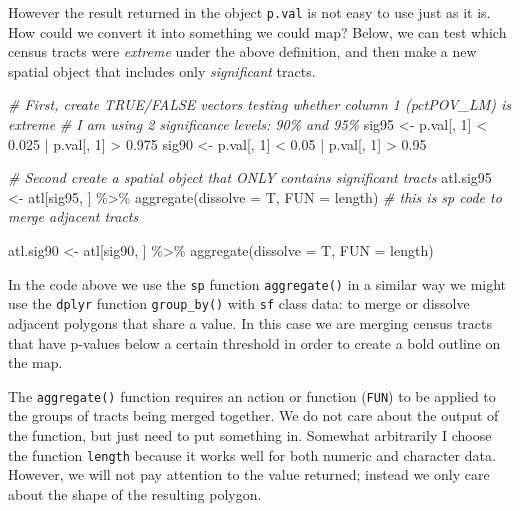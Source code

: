 \documentclass[
]{book}
\newenvironment{Shaded}{\begin{snugshade}}{\end{snugshade}}
\newcommand{\AttributeTok}[1]{\textcolor[rgb]{0.77,0.63,0.00}{#1}}
\newcommand{\CommentTok}[1]{\textcolor[rgb]{0.56,0.35,0.01}{\textit{#1}}}
\newcommand{\DecValTok}[1]{\textcolor[rgb]{0.00,0.00,0.81}{#1}}
\newcommand{\FloatTok}[1]{\textcolor[rgb]{0.00,0.00,0.81}{#1}}
\newcommand{\FunctionTok}[1]{\textcolor[rgb]{0.00,0.00,0.00}{#1}}
\newcommand{\NormalTok}[1]{#1}
\newcommand{\OtherTok}[1]{\textcolor[rgb]{0.56,0.35,0.01}{#1}}
\newcommand{\SpecialCharTok}[1]{\textcolor[rgb]{0.00,0.00,0.00}{#1}}
\newenvironment{rmdtip}[1]
  {
  \begin{itemize}
  \renewcommand{\labelitemi}{
    \raisebox{-.7\height}[0pt][0pt]{
      {\setkeys{Gin}{width=3em,keepaspectratio}\texttt{[image: images/\#1]}}
    }
  }
  \setlength{\fboxsep}{1em}
  \begin{tip}
  \item
  }
  {
  \end{tip}
  \end{itemize}
  }
\begin{document}
However the result returned in the object \texttt{p.val} is not easy to use just as it is. How could we convert it into something we could map? Below, we can test which census tracts were \emph{extreme} under the above definition, and then make a new spatial object that includes only \emph{significant} tracts.

\begin{Shaded}
\begin{Highlighting}[]
\CommentTok{\# First, create TRUE/FALSE vectors testing whether column 1 (pctPOV\_LM) is extreme}
\CommentTok{\# I am using 2 significance levels: 90\% and 95\%}
\NormalTok{sig95 }\OtherTok{\textless{}{-}}\NormalTok{ p.val[, }\DecValTok{1}\NormalTok{] }\SpecialCharTok{\textless{}} \FloatTok{0.025} \SpecialCharTok{|}\NormalTok{ p.val[, }\DecValTok{1}\NormalTok{] }\SpecialCharTok{\textgreater{}} \FloatTok{0.975}
\NormalTok{sig90 }\OtherTok{\textless{}{-}}\NormalTok{ p.val[, }\DecValTok{1}\NormalTok{] }\SpecialCharTok{\textless{}} \FloatTok{0.05} \SpecialCharTok{|}\NormalTok{ p.val[, }\DecValTok{1}\NormalTok{] }\SpecialCharTok{\textgreater{}} \FloatTok{0.95}

\CommentTok{\# Second create a spatial object that ONLY contains significant tracts}
\NormalTok{atl.sig95 }\OtherTok{\textless{}{-}}\NormalTok{ atl[sig95, ] }\SpecialCharTok{\%\textgreater{}\%} 
  \FunctionTok{aggregate}\NormalTok{(}\AttributeTok{dissolve =}\NormalTok{ T, }\AttributeTok{FUN =}\NormalTok{ length) }\CommentTok{\# this is sp code to merge adjacent tracts}

\NormalTok{atl.sig90 }\OtherTok{\textless{}{-}}\NormalTok{ atl[sig90, ] }\SpecialCharTok{\%\textgreater{}\%}
  \FunctionTok{aggregate}\NormalTok{(}\AttributeTok{dissolve =}\NormalTok{ T, }\AttributeTok{FUN =}\NormalTok{ length)}
\end{Highlighting}
\end{Shaded}

\begin{rmdtip}{tip}
In the code above we use the \texttt{sp} function \texttt{aggregate()} in a similar way we might use the \texttt{dplyr} function \texttt{group\_by()} with \texttt{sf} class data: to merge or dissolve adjacent polygons that share a value. In this case we are merging census tracts that have p-values below a certain threshold in order to create a bold outline on the map.

The \texttt{aggregate()} function requires an action or function (\texttt{FUN}) to be applied to the groups of tracts being merged together. We do not care about the output of the function, but just need to put something in. Somewhat arbitrarily I choose the function \texttt{length} because it works well for both numeric and character data. However, we will not pay attention to the value returned; instead we only care about the shape of the resulting polygon.

\end{rmdtip}
\end{document}
